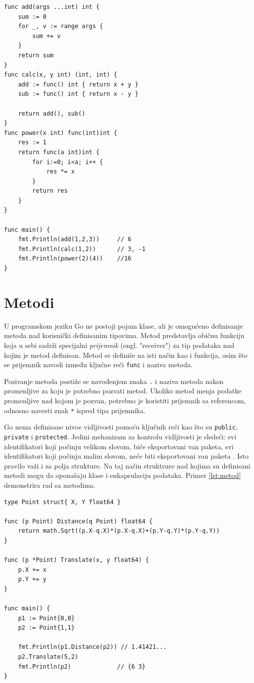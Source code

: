 \documentclass[12pt,oneside]{memoir}
\begin{document}
\begin{center}
\begin{lstlisting}[caption=Rad sa funkcijama, label={lst:func},  backgroundcolor=\color{background}]
func add(args ...int) int {
	sum := 0
	for _, v := range args {
		sum += v
	}
	return sum
}
func calc(x, y int) (int, int) {
	add := func() int { return x + y }
	sub := func() int { return x - y }

	return add(), sub()
}	
func power(x int) func(int)int {
	res := 1
	return func(a int)int {
		for i:=0; i<a; i++ {
			res *= x
		}
		return res
	}
}

func main() {
	fmt.Println(add(1,2,3))		// 6
	fmt.Println(calc(1,2)) 		// 3, -1
	fmt.Println(power(2)(4))	//16
}
\end{lstlisting}
\end{center}

\section{Metodi}  \label{metod}

U programskom jeziku Go ne postoji pojam klase, ali je omogućeno definisanje metoda nad korisnički definisanim tipovima. Metod predstavlja običnu funkciju koja u sebi sadrži specijalni \textit{prijemnik} (engl. "receiver") za tip podataka nad kojim je metod definisan. Metod se definiše na isti način kao i funkcija, osim što se prijemnik navodi između ključne reči \texttt{func} i naziva metoda.

Pozivanje metoda postiže se navođenjem znaka \texttt{.} i naziva metoda nakon promenljive za koju je potrebno pozvati metod. Ukoliko metod menja podatke promenljive nad kojom je pozvan, potrebno je koristiti prijemnik sa referencom, odnosno navesti znak \texttt{*} ispred tipa prijemnika. 
 
Go nema definisane nivoe vidljivosti  pomoću ključnih reči kao što su \texttt{public}, \texttt{private} i \texttt{protected}. Jedini mehanizam za kontrolu vidljivosti je sledeći: svi identifikatori koji počinju velikom slovom, biće eksportovani van paketa, svi identifikatori koji počinju malim slovom, neće biti eksportovani van paketa \cite{bookGoProg}. Isto pravilo važi i za polja strukture. Na taj način struktrure nad kojima su definisani metodi mogu da oponašaju klase i enkapsulaciju podataka. Primer \ref{lst:metod} demonstrira rad sa metodima.

\begin{center}
\begin{lstlisting}[caption=Rad sa metodima, label={lst:metod},  backgroundcolor=\color{background}]
type Point struct{ X, Y float64 }

func (p Point) Distance(q Point) float64 {
	return math.Sqrt((p.X-q.X)*(p.X-q.X)+(p.Y-q.Y)*(p.Y-q.Y))
}

func (p *Point) Translate(x, y float64) {
	p.X += x
	p.Y += y
}

func main() {
	p1 := Point{0,0}
	p2 := Point{1,1}

	fmt.Println(p1.Distance(p2)) // 1.41421...
	p2.Translate(5,2)
	fmt.Println(p2)				// {6 3}
}
\end{lstlisting}
\end{center}
\end{document}
